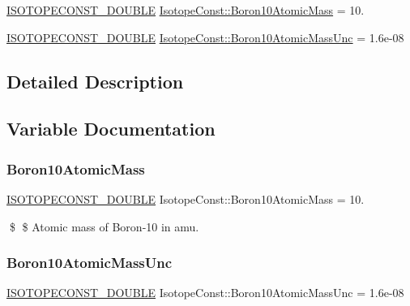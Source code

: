 \begin{DoxyCompactItemize}
\item 
\mbox{\hyperlink{group___isotope_const-_macros_ga8f45a7272ce02c0b4c65c44636ed719a}{I\+S\+O\+T\+O\+P\+E\+C\+O\+N\+S\+T\+\_\+\+D\+O\+U\+B\+LE}} \mbox{\hyperlink{group___isotope_const-_boron-_b10_ga09c7064e1e28e7a9daa6ca75e1d82b36}{Isotope\+Const\+::\+Boron10\+Atomic\+Mass}} = 10.
\item 
\mbox{\hyperlink{group___isotope_const-_macros_ga8f45a7272ce02c0b4c65c44636ed719a}{I\+S\+O\+T\+O\+P\+E\+C\+O\+N\+S\+T\+\_\+\+D\+O\+U\+B\+LE}} \mbox{\hyperlink{group___isotope_const-_boron-_b10_ga35f622c123421d864c5a5772962693e4}{Isotope\+Const\+::\+Boron10\+Atomic\+Mass\+Unc}} = 1.\+6e-\/08
\end{DoxyCompactItemize}


\subsection{Detailed Description}


\subsection{Variable Documentation}
\mbox{\label{group___isotope_const-_boron-_b10_ga09c7064e1e28e7a9daa6ca75e1d82b36}} 
\subsubsection{\texorpdfstring{Boron10\+Atomic\+Mass}{Boron10AtomicMass}}
{\footnotesize\ttfamily \mbox{\hyperlink{group___isotope_const-_macros_ga8f45a7272ce02c0b4c65c44636ed719a}{I\+S\+O\+T\+O\+P\+E\+C\+O\+N\+S\+T\+\_\+\+D\+O\+U\+B\+LE}} Isotope\+Const\+::\+Boron10\+Atomic\+Mass = 10.}

\$ \$ Atomic mass of Boron-\/10 in amu. \mbox{\label{group___isotope_const-_boron-_b10_ga35f622c123421d864c5a5772962693e4}} 
\subsubsection{\texorpdfstring{Boron10\+Atomic\+Mass\+Unc}{Boron10AtomicMassUnc}}
{\footnotesize\ttfamily \mbox{\hyperlink{group___isotope_const-_macros_ga8f45a7272ce02c0b4c65c44636ed719a}{I\+S\+O\+T\+O\+P\+E\+C\+O\+N\+S\+T\+\_\+\+D\+O\+U\+B\+LE}} Isotope\+Const\+::\+Boron10\+Atomic\+Mass\+Unc = 1.\+6e-\/08}

